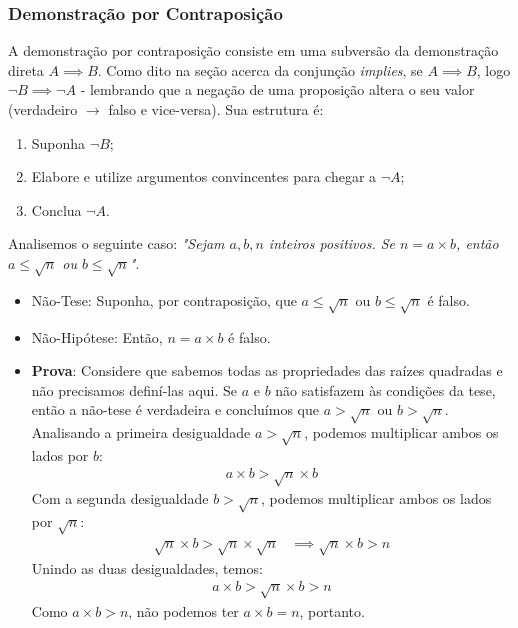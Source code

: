 \documentclass{article}
\begin{document}
\subsubsection{Demonstração por Contraposição}
A demonstração por contraposição consiste em uma subversão da demonstração direta $A \implies B$. Como dito na seção acerca da conjunção \emph{implies}, se $A \implies B$, logo $\lnot B \implies \lnot A$ - lembrando que a negação de uma proposição altera o seu valor (verdadeiro $\rightarrow$ falso e vice-versa).
Sua estrutura é:
\begin{enumerate}
    \item Suponha $\lnot B$;
    \item Elabore e utilize argumentos convincentes para chegar a $\lnot A$;
    \item Conclua $\lnot A$.
\end{enumerate}
Analisemos o seguinte caso: \emph{"Sejam $a, b, n$ inteiros positivos. Se $n = a \times b$, então $ a \leq \sqrt{n}$ ou $b \leq \sqrt{n}$"}.
\begin{itemize}
    \item Não-Tese: Suponha, por contraposição, que $a \leq \sqrt{n}$ ou $b \leq \sqrt{n}$ é falso.
    \item Não-Hipótese: Então, $n = a \times b$ é falso.
    \item \textbf{Prova}: Considere que sabemos todas as propriedades das raízes quadradas e não precisamos definí-las aqui. Se $a$ e $b$ não satisfazem às condições da tese, então a não-tese é verdadeira e concluímos que $a > \sqrt{n}$ ou $b > \sqrt{n}$. Analisando a primeira desigualdade $a > \sqrt{n}$, podemos multiplicar ambos os lados por $b$:
    \begin{align*}
        a \times b > \sqrt{n} \times b
    \end{align*}
    Com a segunda desigualdade $b > \sqrt{n}$, podemos multiplicar ambos os lados por $\sqrt{n}$:
    \begin{align*}
        \sqrt{n} \times b > \sqrt{n} \times \sqrt{n} &\implies
        \sqrt{n} \times b > n
    \end{align*}
    Unindo as duas desigualdades, temos:
    \begin{align*}
        a \times b > \sqrt{n} \times b > n
    \end{align*}
   Como $a \times b > n$, não podemos ter $a \times b = n$, portanto.
    
\end{itemize}
\end{document}
